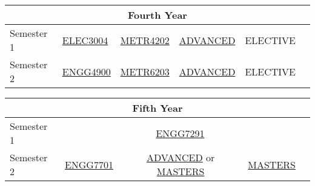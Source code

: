 \begin{table}[H]
    \centering
    \begin{tabular}{| m{6em} | m{5em} m{5em} m{5em} m{5em} m{5em} |}
        \hline
        \multicolumn{6}{|c|}{\bfseries Fourth Year} \\
        \hline
        Semester 1 & \hyperlink{ELEC3004}{ELEC3004} & \hyperlink{METR4202}{METR4202} & \hyperlink{ADVANCED}{ADVANCED} & ELECTIVE & \\
        Semester 2 & \hyperlink{ENGG4900}{ENGG4900} & \hyperlink{METR6203}{METR6203} & \hyperlink{ADVANCED}{ADVANCED} & ELECTIVE & \\
        \hline
    \end{tabular}
\end{table}
\begin{table}[H]
    \centering
    \begin{tabular}{| m{6em} | m{5em} m{5em} m{5em} m{5em} m{5em} |}
        \hline
        \multicolumn{6}{|c|}{\bfseries Fifth Year} \\
        \hline
        Semester 1 & \multicolumn{4}{c}{\hyperlink{ENGG7291}{ENGG7291}} & \\
        Semester 2 & \hyperlink{ENGG7701}{ENGG7701} & \multicolumn{2}{c}{\hyperlink{ADVANCED}{ADVANCED} or \hyperlink{MASTERS}{MASTERS}} & \hyperlink{MASTERS}{MASTERS} & \\
        \hline
    \end{tabular}
\end{table}
\renewcommand{\arraystretch}{1}
\newpage

